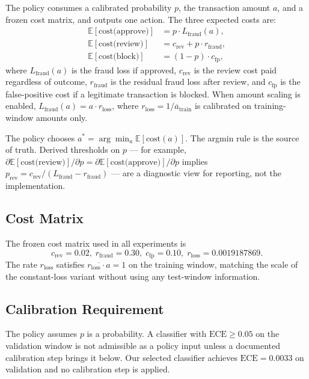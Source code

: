 \documentclass[conference]{IEEEtran}
\begin{document}
The policy consumes a calibrated probability $p$, the transaction amount
$a$, and a frozen cost matrix, and outputs one action. The three expected
costs are:
\begin{align}
\mathbb{E}[\text{cost(approve)}] &= p \cdot L_{\text{fraud}}(a), \label{eq:app}\\
\mathbb{E}[\text{cost(review)}]  &= c_{\text{rev}} + p \cdot r_{\text{fraud}}, \label{eq:rev}\\
\mathbb{E}[\text{cost(block)}]   &= (1 - p) \cdot c_{\text{fp}}, \label{eq:blk}
\end{align}
where $L_{\text{fraud}}(a)$ is the fraud loss if approved, $c_{\text{rev}}$
is the review cost paid regardless of outcome, $r_{\text{fraud}}$ is the
residual fraud loss after review, and $c_{\text{fp}}$ is the false-positive
cost if a legitimate transaction is blocked. When amount scaling is enabled,
$L_{\text{fraud}}(a) = a \cdot r_{\text{loss}}$, where $r_{\text{loss}} =
1 / \overline{a}_{\text{train}}$ is calibrated on training-window amounts
only.

The policy chooses $a^* = \arg\min_{a} \mathbb{E}[\text{cost}(a)]$. The
argmin rule is the source of truth. Derived thresholds on $p$ --- for
example, $\partial \mathbb{E}[\text{cost(review)}] / \partial p = \partial
\mathbb{E}[\text{cost(approve)}] / \partial p$ implies $p_{\text{rev}} =
c_{\text{rev}} / (L_{\text{fraud}} - r_{\text{fraud}})$ --- are a
diagnostic view for reporting, not the implementation.

\subsection{Cost Matrix}

The frozen cost matrix used in all experiments is
\begin{equation}
c_{\text{rev}} = 0.02,\; r_{\text{fraud}} = 0.30,\; c_{\text{fp}} = 0.10,\;
r_{\text{loss}} = 0.0019187869 .
\end{equation}
The rate $r_{\text{loss}}$ satisfies $\overline{r_{\text{loss}} \cdot a} =
1$ on the training window, matching the scale of the constant-loss variant
without using any test-window information.

\subsection{Calibration Requirement}

The policy assumes $p$ is a probability. A classifier with $\text{ECE} \geq
0.05$ on the validation window is not admissible as a policy input unless a
documented calibration step brings it below. Our selected classifier
achieves $\text{ECE} = 0.0033$ on validation and no calibration step is
applied.
\end{document}
